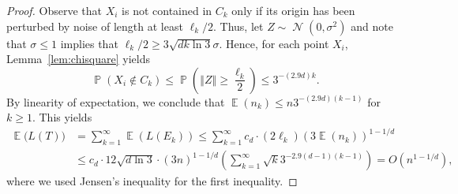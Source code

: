 \documentclass[11pt,DIV=12,a4paper]{scrartcl}
\DeclareMathOperator{\probab}{\mathbb{P}}
\DeclareMathOperator{\expected}{\mathbb{E}}
\newcommand{\norm}[1]{\left\Vert #1 \right\Vert}
\DeclareMathOperator{\Gauss}{\mathcal{N}}
\begin{document}
\begin{proof}
Observe that $X_i$ is not contained in $C_k$ only if its origin has been perturbed by noise of length at least $\ell_k/2$.
Thus, let $Z\sim \Gauss(0, \sigma^2)$ %
and note that %
$\sigma \le 1$ implies that $\ell_k/2 \ge 3\sqrt{dk\ln 3}\sigma$. Hence, for each point $X_i$, Lemma~\ref{lem:chisquare}
yields
\[
   \probab(X_i \notin C_k) \le \probab\left(\norm{Z} \ge \frac{\ell_k}{2}\right) \le 3^{-(2.9d)k}.
\]
By linearity of expectation, we conclude that $\expected(n_k) \le n3^{-(2.9d)(k-1)}$ for $k\ge 1$. %
This yields
\begin{align*} 
\expected\bigl(L(T)\bigr) & =  \sum_{k=1}^\infty \expected(L(E_k)) 
 \le  \sum_{k=1}^\infty c_d \cdot (2\ell_k) (3\expected(n_k))^{1-1/d}\\
& \le  c_d \cdot 12\sqrt{d\ln 3}\cdot (3n)^{1-1/d} \left(\sum_{k=1}^\infty \sqrt{k} 3^{-2.9(d-1)(k-1)}\right) = O(n^{1-1/d}),
\end{align*} 
where we used Jensen's inequality for the first inequality.


\end{proof}
\end{document}
